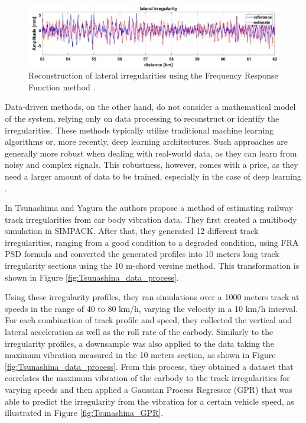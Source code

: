 \begin{figure}[H]
    \centering
    \includegraphics[width=12cm]{Cap2_LitReview/Track_Quality_Accel/DeRosa_Result_Real.png}
    \caption{Reconstruction of lateral irregularities using the Frequency Response Function method \cite{DEROSA2019606}.}
    \label{fig:DeRosa_Results}
\end{figure}

Data-driven methods, on the other hand, do not consider a mathematical model of the system, relying only on data processing to reconstruct or identify the irregularities. These methods typically utilize traditional machine learning algorithms or, more recently, deep learning architectures. Such approaches are generally more robust when dealing with real-world data, as they can learn from noisy and complex signals. This robustness, however, comes with a price, as they need a larger amount of data to be trained, especially in the case of deep learning \cite{Sansinena26032025}. 

In Tsunashima and Yagura \cite{vibration7040049} the authors propose a method of estimating railway track irregularities from car body vibration data. They first created a multibody simulation in SIMPACK. After that, they generated 12 different track irregularities, ranging from a good condition to a degraded condition, using FRA PSD formula and converted the generated profiles into 10 meters long track irregularity sections using the 10 m-chord versine method. This transformation is shown in Figure \ref{fig:Tsunashina_data_process}.

Using these irregularity profiles, they ran simulations over a 1000 meters track at speeds in the range of 40 to 80 km/h, varying the velocity in a 10 km/h interval. For each combination of track profile and speed, they collected the vertical and lateral acceleration as well as the roll rate of the carbody. Similarly to the irregularity profiles, a downsample was also applied to the data taking the maximum vibration measured in the 10 meters section, as shown in Figure \ref{fig:Tsunashina_data_process}. From this process, they obtained a dataset that correlates the maximum vibration of the carbody to the track irregularities for varying speeds and then applied a Gaussian Process Regressor (GPR) that was able to predict the irregularity from the vibration for a certain vehicle speed, as illustrated in Figure \ref{fig:Tsunashina_GPR}. 


